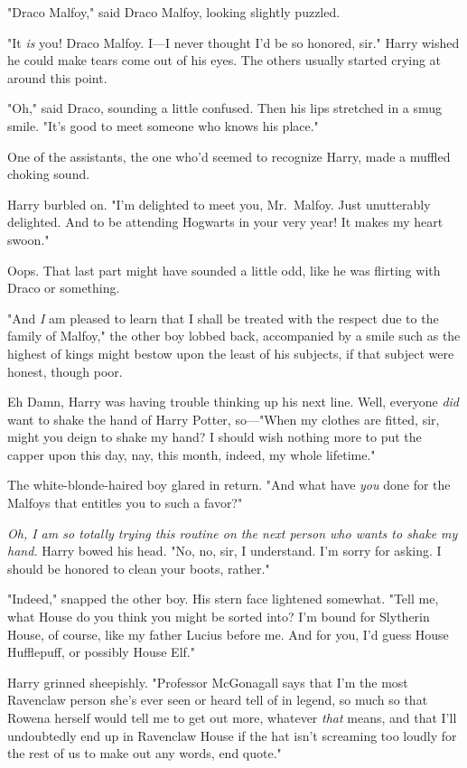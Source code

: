 "Draco Malfoy," said Draco Malfoy, looking slightly puzzled.

"It \emph{is} you! Draco Malfoy. I---I never thought I'd be so honored, sir."
Harry wished he could make tears come out of his eyes. The others usually
started crying at around this point.

"Oh," said Draco, sounding a little confused. Then his lips stretched in a smug
smile. "It's good to meet someone who knows his place."

One of the assistants, the one who'd seemed to recognize Harry, made a muffled
choking sound.

Harry burbled on. "I'm delighted to meet you, Mr.~Malfoy. Just unutterably
delighted. And to be attending Hogwarts in your very year! It makes my heart
swoon."

Oops. That last part might have sounded a little odd, like he was flirting with
Draco or something.

"And \emph{I} am pleased to learn that I shall be treated with the respect due
to the family of Malfoy," the other boy lobbed back, accompanied by a smile
such as the highest of kings might bestow upon the least of his subjects, if
that subject were honest, though poor.

Eh{\el} Damn, Harry was having trouble thinking up his next line. Well,
everyone \emph{did} want to shake the hand of Harry Potter, so\mbox{---}"When my
clothes are fitted, sir, might you deign to shake my hand? I should wish
nothing more to put the capper upon this day, nay, this month, indeed, my whole
lifetime."

The white-blonde-haired boy glared in return. "And what have \emph{you} done
for the Malfoys that entitles you to such a favor?"

\emph{Oh, I am so totally trying this routine on the next person who wants to
shake my hand.} Harry bowed his head. "No, no, sir, I understand. I'm sorry for
asking. I should be honored to clean your boots, rather."

"Indeed," snapped the other boy. His stern face lightened somewhat. "Tell me,
what House do you think you might be sorted into? I'm bound for Slytherin
House, of course, like my father Lucius before me. And for you, I'd guess House
Hufflepuff, or possibly House Elf."

Harry grinned sheepishly. "Professor McGonagall says that I'm the most
Ravenclaw person she's ever seen or heard tell of in legend, so much so that
Rowena herself would tell me to get out more, whatever \emph{that} means, and
that I'll undoubtedly end up in Ravenclaw House if the hat isn't screaming too
loudly for the rest of us to make out any words, end quote."

